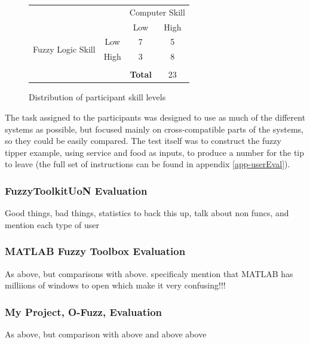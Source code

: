 {{		\begin{figure}[ht!]
		\begin{center}
		\begin{tabular}{cc|cc}
			& &\multicolumn{2}{c}{Computer Skill} \\
			& & Low & High \\
			\hline 
		    \multirow{2}{2cm}{Fuzzy Logic Skill}  & Low & 7 & 5  \\
		     &  High                                    & 3 & 8  \\
		     \hline
		     \\
		     \multicolumn{3}{r}{\textbf{Total}} & 23\\
		\end{tabular}
		\end{center}
		\vspace{-5mm}
		\caption{Distribution of participant skill levels}
		\label{fig-skills}
		\vspace{-2mm}
		\end{figure}
		\noindent 
		The task assigned to the participants was designed to use as much of the different systems as possible, but focused mainly on cross-compatible parts of the systems, so they could be easily compared. The test itself was to construct the fuzzy tipper example, using service and food as inputs, to produce a number for the tip to leave (the full set of instructions can be found in appendix \ref{app-userEval}). 
		}
	}
	\subsubsection{FuzzyToolkitUoN Evaluation}
		{\color{red}
			Good things, bad things, statistics to back this up, talk about non funcs, and mention each type of user
		}
	\subsubsection{MATLAB Fuzzy Toolbox Evaluation} 	
		{\color{red}
			As above, but comparisons with above. specificaly mention that MATLAB has milliions of windows to open which make it very confusing!!!		
		}
	\subsubsection{My Project, O-Fuzz, Evaluation}	
		{\color{red}
			As above, but comparison with above and above above
		}
